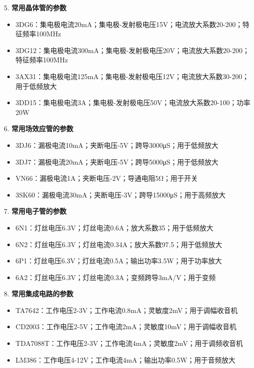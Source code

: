 \documentclass[12pt,UTF8]{ctexbook}
\begin{document}
5. \textbf{常用晶体管的参数}
   \begin{itemize}[leftmargin=3.5em]
   \item 3DG6：集电极电流20mA；集电极-发射极电压15V；电流放大系数20-200；特征频率100MHz
   \item 3DG12：集电极电流300mA；集电极-发射极电压20V；电流放大系数20-200；特征频率100MHz
   \item 3AX31：集电极电流125mA；集电极-发射极电压12V；电流放大系数30-200；用于低频放大
   \item 3DD15：集电极电流3A；集电极-发射极电压50V；电流放大系数20-100；功率20W
   \end{itemize}

6. \textbf{常用场效应管的参数}
   \begin{itemize}[leftmargin=3.5em]
   \item 3DJ6：漏极电流10mA；夹断电压-5V；跨导3000μS；用于低频放大
   \item 3DJ7：漏极电流20mA；夹断电压-5V；跨导5000μS；用于低频放大
   \item VN66：漏极电流1A；夹断电压-2V；导通电阻5Ω；用于开关
   \item 3SK60：漏极电流30mA；夹断电压-3V；跨导15000μS；用于高频放大
   \end{itemize}

7. \textbf{常用电子管的参数}
   \begin{itemize}[leftmargin=3.5em]
   \item 6N1：灯丝电压6.3V；灯丝电流0.6A；放大系数35；用于低频放大
   \item 6N2：灯丝电压6.3V；灯丝电流0.34A；放大系数97.5；用于低频放大
   \item 6P1：灯丝电压6.3V；灯丝电流0.5A；输出功率3.5W；用于功率放大
   \item 6A2：灯丝电压6.3V；灯丝电流0.3A；变频跨导3mA/V；用于变频
   \end{itemize}

8. \textbf{常用集成电路的参数}
   \begin{itemize}[leftmargin=3.5em]
   \item TA7642：工作电压2-3V；工作电流0.8mA；灵敏度2mV；用于调幅收音机
   \item CD2003：工作电压2-5V；工作电流2mA；灵敏度10mV；用于调幅收音机
   \item TDA7088T：工作电压2-3V；工作电流4mA；灵敏度2mV；用于调频收音机
   \item LM386：工作电压4-12V；工作电流4mA；输出功率0.5W；用于音频放大
   \end{itemize}
\end{document}

